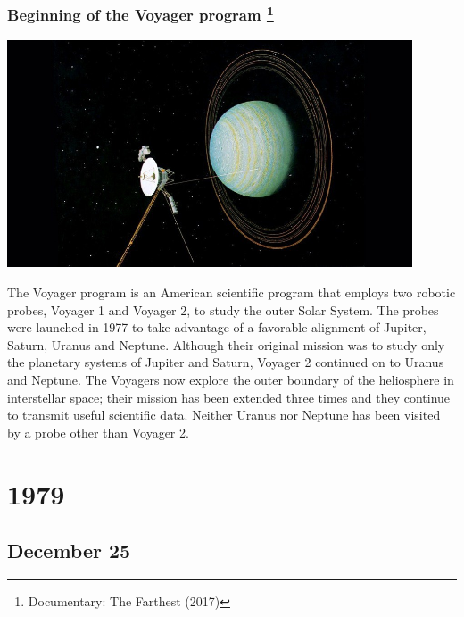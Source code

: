 \documentclass[11pt]{report}
\begin{document}
\subsection{Beginning of the Voyager program \protect\footnote{Documentary: The Farthest (2017)}}
\vspace{2mm}\begin{center}\includegraphics[width=12cm]{./img/voyagerProgram.jpg}\end{center}
The Voyager program is an American scientific program that employs two robotic probes, Voyager 1 and Voyager 2, to study the outer Solar System. The probes were launched in 1977 to take advantage of a favorable alignment of Jupiter, Saturn, Uranus and Neptune. Although their original mission was to study only the planetary systems of Jupiter and Saturn, Voyager 2 continued on to Uranus and Neptune. The Voyagers now explore the outer boundary of the heliosphere in interstellar space; their mission has been extended three times and they continue to transmit useful scientific data. Neither Uranus nor Neptune has been visited by a probe other than Voyager 2.

\chapter{1979}
\section{December 25}
\end{document}

